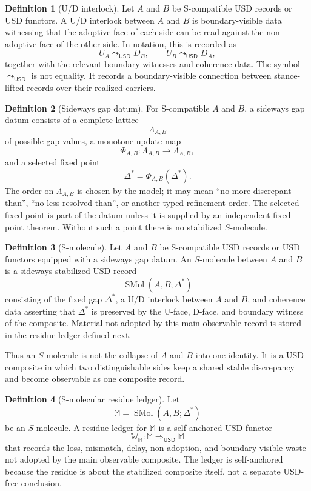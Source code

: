 \documentclass[11pt]{article}
\newcommand{\USD}{\mathsf{USD}}
\newcommand{\uconn}{\mathrel{\leadsto_{\USD}}}
\theoremstyle{definition}
\newtheorem{definition}{Definition}[section]
\theoremstyle{plain}
\begin{document}
\begin{definition}[U/D interlock]
Let \(A\) and \(B\) be S-compatible USD records or USD functors.  A
U/D interlock between \(A\) and \(B\) is boundary-visible data witnessing
that the adoptive face of each side can be read against the non-adoptive
face of the other side.  In notation, this is recorded as
\[
  U_A \uconn D_B,
  \qquad
  U_B \uconn D_A,
\]
together with the relevant boundary witnesses and coherence data.
The symbol \(\uconn\) is not equality.  It records a boundary-visible
connection between stance-lifted records over their realized carriers.
\end{definition}

\begin{definition}[Sideways gap datum]
For S-compatible \(A\) and \(B\), a sideways gap datum consists of a
complete lattice
\[
  \Lambda_{A,B}
\]
of possible gap values, a monotone update map
\[
  \Phi_{A,B}:\Lambda_{A,B}\to\Lambda_{A,B},
\]
and a selected fixed point
\[
  \Delta^*=\Phi_{A,B}(\Delta^*).
\]
The order on \(\Lambda_{A,B}\) is chosen by the model; it may mean
``no more discrepant than'', ``no less resolved than'', or another
typed refinement order.  The selected fixed point is part of the datum
unless it is supplied by an independent fixed-point theorem.  Without
such a point there is no stabilized \(S\)-molecule.
\end{definition}

\begin{definition}[S-molecule]
Let \(A\) and \(B\) be S-compatible USD records or USD functors equipped
with a sideways gap datum.  An \(S\)-molecule between \(A\) and \(B\) is a
sideways-stabilized USD record
\[
  \operatorname{SMol}(A,B;\Delta^*)
\]
consisting of the fixed gap \(\Delta^*\), a U/D interlock between \(A\)
and \(B\), and coherence data asserting that \(\Delta^*\) is preserved by
the U-face, D-face, and boundary witness of the composite.  Material not
adopted by this main observable record is stored in the residue ledger
defined next.

Thus an \(S\)-molecule is not the collapse of \(A\) and \(B\) into one
identity.  It is a USD composite in which two distinguishable sides keep a
shared stable discrepancy and become observable as one composite record.
\end{definition}

\begin{definition}[S-molecular residue ledger]
Let
\[
  \mathbb M=\operatorname{SMol}(A,B;\Delta^*)
\]
be an \(S\)-molecule.  A residue ledger for \(\mathbb M\) is a
self-anchored USD functor
\[
  \mathbb W_{\mathbb M}:\mathbb M\Rightarrow_{\USD}\mathbb M
\]
that records the loss, mismatch, delay, non-adoption, and
boundary-visible waste not adopted by the main observable composite.
The ledger is self-anchored because the residue is about the stabilized
composite itself, not a separate USD-free conclusion.
\end{definition}
\end{document}
